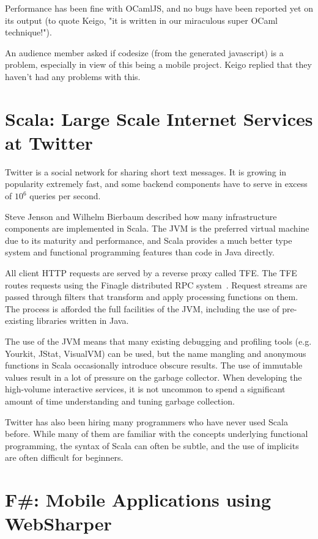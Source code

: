 \documentclass{jfp1}
\begin{document}
Performance has been fine with OCamlJS, and no bugs have been reported
yet on its output (to quote Keigo, "it is written in our miraculous
super OCaml technique!").

An audience member asked if codesize (from the generated javascript)
is a problem, especially in view of this being a mobile project.
Keigo replied that they haven't had any problems with this.

\section{Scala: Large Scale Internet Services at Twitter}

Twitter is a social network for sharing short text messages. It is
growing in popularity extremely fast, and some backend components have
to serve in excess of $10^6$ queries per second.

Steve Jenson and Wilhelm Bierbaum described how many infrastructure
components are implemented in Scala.  The JVM is the preferred virtual
machine due to its maturity and performance, and Scala provides a much
better type system and functional programming features than code in Java
directly.

All client HTTP requests are served by a reverse proxy called TFE. The
TFE routes requests using the Finagle distributed RPC
system~\cite{f}. Request streams are passed through filters that
transform and apply processing functions on them.  The process is
afforded the full facilities of the JVM, including the use of
pre-existing libraries written in Java.

The use of the JVM means that many existing debugging and profiling
tools (e.g.  Yourkit, JStat, VisualVM) can be used, but the name
mangling and anonymous functions in Scala occasionally introduce obscure
results.  The use of immutable values result in a lot of pressure on the
garbage collector. When developing the high-volume interactive services,
it is not uncommon to spend a significant amount of time understanding
and tuning garbage collection.

Twitter has also been hiring many programmers who have never used Scala
before.  While many of them are familiar with the concepts underlying
functional programming, the syntax of Scala can often be subtle, and the
use of implicits are often difficult for beginners.

\section{F\#: Mobile Applications using WebSharper}
\end{document}
